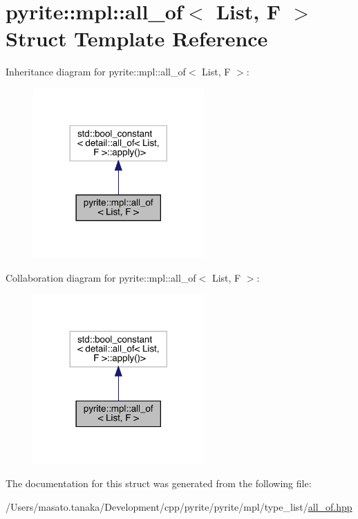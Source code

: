 \hypertarget{structpyrite_1_1mpl_1_1all__of}{}\section{pyrite\+:\+:mpl\+:\+:all\+\_\+of$<$ List, F $>$ Struct Template Reference}
\label{structpyrite_1_1mpl_1_1all__of}


Inheritance diagram for pyrite\+:\+:mpl\+:\+:all\+\_\+of$<$ List, F $>$\+:
\nopagebreak
\begin{figure}[H]
\begin{center}
\leavevmode
\includegraphics[width=185pt]{da/de9/structpyrite_1_1mpl_1_1all__of__inherit__graph}
\end{center}
\end{figure}


Collaboration diagram for pyrite\+:\+:mpl\+:\+:all\+\_\+of$<$ List, F $>$\+:
\nopagebreak
\begin{figure}[H]
\begin{center}
\leavevmode
\includegraphics[width=185pt]{d7/d84/structpyrite_1_1mpl_1_1all__of__coll__graph}
\end{center}
\end{figure}


The documentation for this struct was generated from the following file\+:\begin{DoxyCompactItemize}
\item 
/\+Users/masato.\+tanaka/\+Development/cpp/pyrite/pyrite/mpl/type\+\_\+list/\mbox{\hyperlink{all__of_8hpp}{all\+\_\+of.\+hpp}}\end{DoxyCompactItemize}
